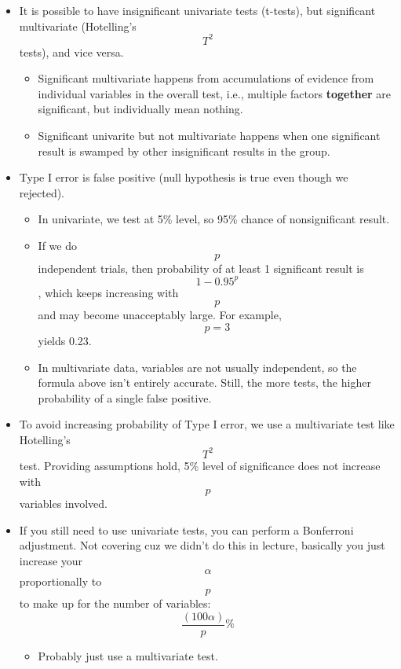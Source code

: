 \documentclass[]{article}
\providecommand{\tightlist}{%
  \setlength{\itemsep}{0pt}\setlength{\parskip}{0pt}}
\begin{document}
\begin{itemize}
\tightlist
\item
  It is possible to have insignificant univariate tests (t-tests), but
  significant multivariate (Hotelling's \[T^2\] tests), and vice versa.

  \begin{itemize}
  \tightlist
  \item
    Significant multivariate happens from accumulations of evidence from
    individual variables in the overall test, i.e., multiple factors
    \textbf{together} are significant, but individually mean nothing.
  \item
    Significant univarite but not multivariate happens when one
    significant result is swamped by other insignificant results in the
    group.
  \end{itemize}
\item
  Type I error is false positive (null hypothesis is true even though we
  rejected).

  \begin{itemize}
  \tightlist
  \item
    In univariate, we test at 5\% level, so 95\% chance of
    nonsignificant result.
  \item
    If we do \[p\] independent trials, then probability of at least 1
    significant result is \[ 1 - 0.95^p \], which keeps increasing with
    \[p\] and may become unacceptably large. For example, \[p = 3\]
    yields 0.23.
  \item
    In multivariate data, variables are not usually independent, so the
    formula above isn't entirely accurate. Still, the more tests, the
    higher probability of a single false positive.
  \end{itemize}
\item
  To avoid increasing probability of Type I error, we use a multivariate
  test like Hotelling's \[T^2\] test. Providing assumptions hold, 5\%
  level of significance does not increase with \[p\] variables involved.
\item
  If you still need to use univariate tests, you can perform a
  Bonferroni adjustment. Not covering cuz we didn't do this in lecture,
  basically you just increase your \[\alpha\] proportionally to \[p\] to
  make up for the number of variables: \[ \frac{(100\alpha)}{p}\%\]

  \begin{itemize}
  \tightlist
  \item
    Probably just use a multivariate test.
  \end{itemize}
\end{itemize}
\end{document}
